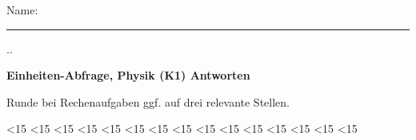 \documentclass[11pt]{article}
\newif\ifprintanswers
\def\printanswers{\printanswerstrue}
\newcounter{exerciseID}
\begin{document}
\printanswers

Name: \rule[-.4ex]{7cm}{.4pt}\hfill%
\the\day.\the\month.\the\year%
\hspace*{.5cm}%


\vspace{6mm}
\textbf{\large Einheiten-Abfrage, Physik (K1) \ifprintanswers \hfill \textcolor{AccentColor}{Antworten}\fi}
\vspace{3mm}

Runde bei Rechenaufgaben ggf. auf drei relevante Stellen.




\ifnum\theexerciseID<15 {} \fi
\ifnum\theexerciseID<15 {} \fi
\ifnum\theexerciseID<15 {} \fi
\ifnum\theexerciseID<15 {} \fi
\ifnum\theexerciseID<15 {} \fi
\ifnum\theexerciseID<15 {} \fi
\ifnum\theexerciseID<15 {} \fi
\ifnum\theexerciseID<15 {} \fi
\ifnum\theexerciseID<15 {} \fi
\ifnum\theexerciseID<15 {} \fi
\ifnum\theexerciseID<15 {} \fi
\ifnum\theexerciseID<15 {} \fi
\ifnum\theexerciseID<15 {} \fi
\ifnum\theexerciseID<15 {} \fi
\ifnum\theexerciseID<15 {} \fi
%
\end{document}

